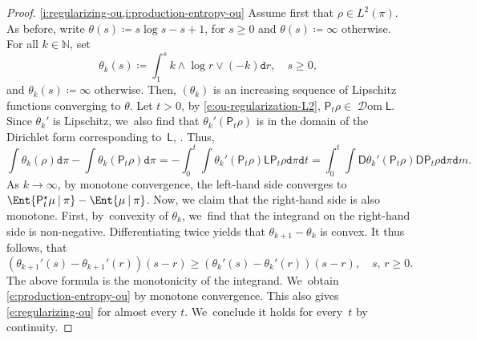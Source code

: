 \documentclass[10pt]{amsart}
\theoremstyle{definition}
\theoremstyle{remark}
\newcommand{\given}[1][]{%
\nonscript\:#1\vert
\allowbreak
\nonscript\:
\mathopen{}}
\DeclareMathOperator{\dom}{\mathscr{D}om}
\begin{document}
\skpt
\begin{proof}
\cref{i:regularizing-ou,i:production-entropy-ou}
Assume first that $\rho \in L^{2}(\pi)$.
As before, write $\theta(s) \coloneq s \log s -s + 1$, for $s \geq 0$ and $\theta(s) \coloneq \infty$ otherwise.
For all $k \in \mathbb{N}$, set
\begin{equation}\label{e:theta-k}
\theta_{k}(s) \coloneq \int_{1}^{s} k \wedge \log r \vee (-k) \mathtt{d} r, \quad s \geq 0,
\end{equation}
and $\theta_{k}(s) \coloneq \infty$ otherwise.
Then, $(\theta_{k})$ is an increasing sequence of Lipschitz functions converging to $\theta$.
Let $t > 0$, by \cref{e:ou-regularization-L2}, $\mathsf{P}_{t}\rho \in \dom \mathsf{L}$.
Since $\theta_{k}'$ is Lipschitz, we~also find that $\theta_{k}'(\mathsf{P}_{t}\rho)$ is in the domain of the Dirichlet form corresponding to~$\mathsf{L}$, \eg \cite[Prop.\,3.3.1, p.\,14]{BouleauHirsch}.
Thus,
\begin{equation*}
\int \theta_{k}(\rho) \mathtt{d} \pi - \int \theta_{k}(\mathsf{P}_{t} \rho) \mathtt{d} \pi = - \int_{0}^{t} \int \theta_{k}'(\mathsf{P}_{t} \rho) \mathsf{L} \mathsf{P}_{t} \rho \mathtt{d} \pi \mathtt{d} t = \int_{0}^{t} \int \mathsf{D} \theta_{k}'(\mathsf{P}_{t} \rho) \mathsf{D} \mathsf{P}_{t} \rho \mathtt{d} \pi \mathtt{d} m.
\end{equation*}
As $k \to \infty$, by monotone convergence, the left-hand side converges to $\Ent{ \mathsf{P}_{t}^{\star} \mu \given \pi } - \Ent{ \mu \given \pi }$.
Now, we claim that the right-hand side is also monotone.
First, by~convexity of $\theta_{k}$, we~find that the integrand on the right-hand side is non-negative.
Differentiating twice yields that $\theta_{k+1} - \theta_{k}$ is convex.
It thus follows, that
\begin{equation}\label{e:theta-monotone-convex}
(\theta_{k+1}'(s) - \theta_{k+1}'(r))(s-r) \geq (\theta_{k}'(s) - \theta_{k}'(r))(s-r), \quad s,\, r \geq 0.
\end{equation}
The above formula is the monotonicity of the integrand. We~obtain \cref{e:production-entropy-ou} by monotone convergence.
This also gives \cref{e:regularizing-ou} for almost every $t$. We~conclude it holds for every~$t$ by continuity.


\end{proof}
\end{document}

